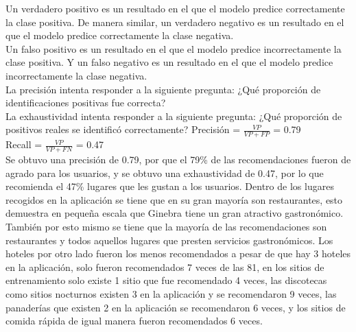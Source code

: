 \documentclass[12pt,letterpaper,openany]{book}
\begin{document}
Un verdadero positivo es un resultado en el que el modelo predice correctamente la clase positiva. De manera similar, un verdadero negativo es un resultado en el que el modelo predice correctamente la clase negativa.\\
Un falso positivo es un resultado en el que el modelo predice incorrectamente la clase positiva. Y un falso negativo es un resultado en el que el modelo predice incorrectamente la clase negativa.\\
La precisión intenta responder a la siguiente pregunta: ¿Qué proporción de identificaciones positivas fue correcta?\\
La exhaustividad intenta responder a la siguiente pregunta: ¿Qué proporción de positivos reales se identificó correctamente?\cite{13}\cite{28}
\vspace{5mm}\newline
Precisión = $\frac{VP}{VP+FP}$ = 0.79 \\
Recall = $\frac{VP}{VP+FN}$ = 0.47\\
\newline
Se obtuvo una precisión de 0.79, por que el 79\% de las recomendaciones fueron de agrado para los usuarios, y se obtuvo una exhaustividad de 0.47, por lo que recomienda el 47\% lugares que les gustan a los usuarios.
\vspace{5mm}\newline
Dentro de los lugares recogidos en la aplicación se tiene que en su gran mayoría son restaurantes, esto demuestra en pequeña escala que Ginebra tiene un gran atractivo gastronómico. También por esto mismo se tiene que la mayoría de las recomendaciones son restaurantes y todos aquellos lugares que presten servicios gastronómicos. Los hoteles por otro lado fueron los menos recomendados a pesar de que hay 3 hoteles en la aplicación, solo fueron recomendados 7 veces de las 81, en los sitios de entrenamiento solo existe 1 sitio que fue recomendado 4 veces, las discotecas como sitios nocturnos existen 3 en la aplicación y se recomendaron 9 veces, las panaderías que existen 2 en la aplicación se recomendaron 6 veces, y los sitios de comida rápida de igual manera fueron recomendados 6 veces.
\end{document}
